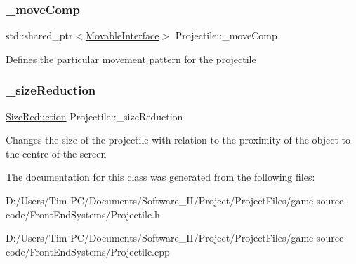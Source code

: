 \subsubsection{\texorpdfstring{\+\_\+move\+Comp}{\_moveComp}}
{\footnotesize\ttfamily std\+::shared\+\_\+ptr$<$\hyperlink{class_movable_interface}{Movable\+Interface}$>$ Projectile\+::\+\_\+move\+Comp\hspace{0.3cm}{\ttfamily [private]}}

Defines the particular movement pattern for the projectile \mbox{\label{class_projectile_adaf2c52cd2491197174be5a5faeca052}} 
\subsubsection{\texorpdfstring{\+\_\+size\+Reduction}{\_sizeReduction}}
{\footnotesize\ttfamily \hyperlink{class_size_reduction}{Size\+Reduction} Projectile\+::\+\_\+size\+Reduction\hspace{0.3cm}{\ttfamily [private]}}

Changes the size of the projectile with relation to the proximity of the object to the centre of the screen 

The documentation for this class was generated from the following files\+:\begin{DoxyCompactItemize}
\item 
D\+:/\+Users/\+Tim-\/\+P\+C/\+Documents/\+Software\+\_\+\+I\+I/\+Project/\+Project\+Files/game-\/source-\/code/\+Front\+End\+Systems/Projectile.\+h\item 
D\+:/\+Users/\+Tim-\/\+P\+C/\+Documents/\+Software\+\_\+\+I\+I/\+Project/\+Project\+Files/game-\/source-\/code/\+Front\+End\+Systems/Projectile.\+cpp\end{DoxyCompactItemize}
